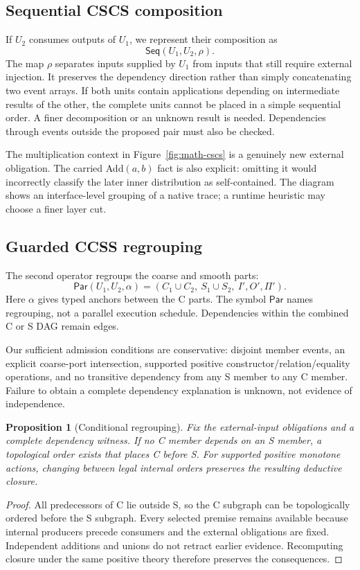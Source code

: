 \documentclass[11pt,a4paper]{article}
\newtheorem{proposition}{Proposition}
\newcommand{\Seq}{\mathsf{Seq}}
\newcommand{\Par}{\mathsf{Par}}
\begin{document}
\subsection{Sequential CSCS composition}
If $U_2$ consumes outputs of $U_1$, we represent their composition as
\begin{equation}
 \Seq(U_1,U_2,\rho).
\end{equation}
The map $\rho$ separates inputs supplied by $U_1$ from inputs that still require
external injection. It preserves the dependency direction rather than simply
concatenating two event arrays. If both units contain applications depending on
intermediate results of the other, the complete units cannot be placed in a
simple sequential order. A finer decomposition or an unknown result is needed.
Dependencies through events outside the proposed pair must also be checked.

\MathCSCS
The multiplication context in Figure~\ref{fig:math-cscs} is a genuinely new
external obligation. The carried Add$(a,b)$ fact is also explicit: omitting it
would incorrectly classify the later inner distribution as self-contained.
The diagram shows an interface-level grouping of a native trace; a runtime
heuristic may choose a finer layer cut.

\subsection{Guarded CCSS regrouping}
The second operator regroups the coarse and smooth parts:
\begin{equation}
 \Par(U_1,U_2,\alpha)
   = (C_1\cup C_2,\ S_1\cup S_2,\ I',O',\Pi').
\end{equation}
Here $\alpha$ gives typed anchors between the C parts. The symbol $\Par$ names
regrouping, not a parallel execution schedule. Dependencies within the combined C or S DAG remain edges.

Our sufficient admission conditions are conservative: disjoint member events,
an explicit coarse-port intersection, supported positive
constructor/relation/equality operations, and no transitive dependency from
any S member to any C member. Failure to obtain a complete dependency explanation is unknown, not evidence
of independence.

\begin{proposition}[Conditional regrouping]
Fix the external-input obligations and a complete dependency witness. If no C
member depends on an S member, a topological order exists that places C before S.
For supported positive monotone actions, changing between legal internal orders
preserves the resulting deductive closure.
\end{proposition}
\begin{proof}
All predecessors of C lie outside S, so the C subgraph can be topologically
ordered before the S subgraph. Every selected premise remains available because
internal producers precede consumers and the external obligations are fixed.
Independent additions and unions do not retract earlier evidence. Recomputing
closure under the same positive theory therefore preserves the consequences.
\end{proof}
\end{document}
